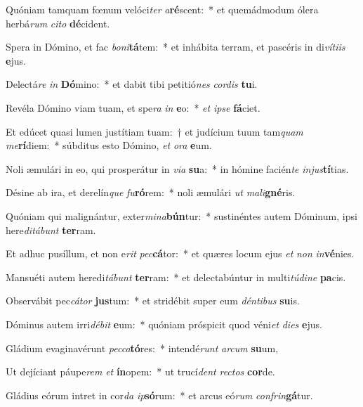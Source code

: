 \item Quóniam tamquam fœnum velóci\textit{ter} \textit{a}\textbf{ré}scent:~* et quemádmodum ólera herbá\textit{rum} \textit{ci}\textit{to} \textbf{dé}cident.
\item Spera in Dómino, et fac \textit{bo}\textit{ni}\textbf{tá}tem:~* et inhábita terram, et pascéris in di\textit{ví}\textit{ti}\textit{is} \textbf{e}jus.
\item Delectá\textit{re} \textit{in} \textbf{Dó}mino:~* et dabit tibi petitió\textit{nes} \textit{cor}\textit{dis} \textbf{tu}i.
\item Revéla Dómino viam tuam, et spe\textit{ra} \textit{in} \textbf{e}o:~* \textit{et} \textit{ip}\textit{se} \textbf{fá}ciet.
\item Et edúcet quasi lumen justítiam tuam:~† et judícium tuum tam\textit{quam} \textit{me}\textbf{rí}diem:~* súbditus esto Dómino, \textit{et} \textit{o}\textit{ra} \textbf{e}um.
\item Noli æmulári in eo, qui prosperátur in \textit{vi}\textit{a} \textbf{su}a:~* in hómine facién\textit{te} \textit{in}\textit{jus}\textbf{tí}tias.
\item Désine ab ira, et derelín\textit{que} \textit{fu}\textbf{ró}rem:~* noli æmulári \textit{ut} \textit{ma}\textit{li}\textbf{gné}ris.
\item Quóniam qui malignántur, exter\textit{mi}\textit{na}\textbf{bún}tur:~* sustinéntes autem Dóminum, ipsi here\textit{di}\textit{tá}\textit{bunt} \textbf{ter}ram.
\item Et adhuc pusíllum, et non e\textit{rit} \textit{pec}\textbf{cá}tor:~* et quæres locum ejus \textit{et} \textit{non} \textit{in}\textbf{vé}nies.
\item Mansuéti autem heredi\textit{tá}\textit{bunt} \textbf{ter}ram:~* et delectabúntur in multi\textit{tú}\textit{di}\textit{ne} \textbf{pa}cis.
\item Observábit pec\textit{cá}\textit{tor} \textbf{jus}tum:~* et stridébit super eum \textit{dén}\textit{ti}\textit{bus} \textbf{su}is.
\item Dóminus autem irri\textit{dé}\textit{bit} \textbf{e}um:~* quóniam próspicit quod véni\textit{et} \textit{di}\textit{es} \textbf{e}jus.
\item Gládium evaginavérunt \textit{pec}\textit{ca}\textbf{tó}res:~* intendé\textit{runt} \textit{ar}\textit{cum} \textbf{su}um,
\item Ut dejíciant páupe\textit{rem} \textit{et} \textbf{ín}opem:~* ut trucí\textit{dent} \textit{rec}\textit{tos} \textbf{cor}de.
\item Gládius eórum intret in cor\textit{da} \textit{ip}\textbf{só}rum:~* et arcus eó\textit{rum} \textit{con}\textit{frin}\textbf{gá}tur.
